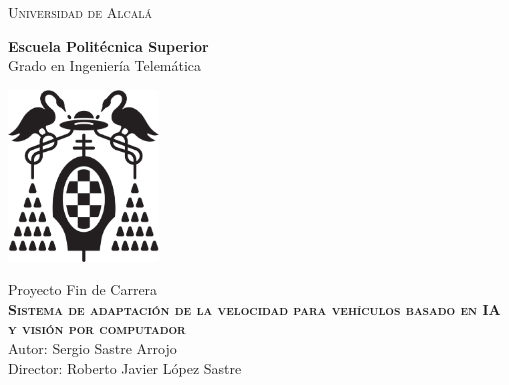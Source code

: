 
\begin{center}
\LARGE \textsc{Universidad de Alcalá}\\
\vspace{0.5cm}

\textbf{Escuela Politécnica Superior}\\

Grado en Ingeniería Telemática
\end{center}

\vspace{0.5cm}

\begin{center}
\includegraphics[width=4cm]{Figuras/LogoUAH.eps}\\
\end{center}


\begin{center}
\vspace{1cm}

\LARGE Proyecto Fin de Carrera\\
\textbf{\Huge \textsc{{Sistema de adaptación de la velocidad para vehículos basado en IA y visión por computador}}}\\
\vspace{0.5cm}
\large Autor: Sergio Sastre Arrojo\\
Director: Roberto Javier López Sastre\\
\vspace{0.5cm}
\end{center}

